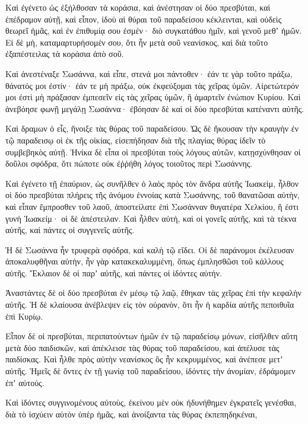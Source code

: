 {\par }{\PP {}Καὶ ἐγένετο ὡς ἐξήλθοσαν τὰ κοράσια, καὶ ἀνέστησαν οἱ δύο πρεσβύται, καὶ ἐπέδραμον αὐτῇ,
καὶ εἶπον, ἰδοὺ αἱ θύραι τοῦ παραδείσου κέκλεινται, καὶ οὐδεὶς θεωρεῖ ἡμᾶς, καὶ ἐν ἐπιθυμίᾳ σου ἐσμέν· διὸ συγκατάθου ἡμῖν, καὶ γενοῦ μεθʼ ἡμῶν.
Εἰ δὲ μὴ, καταμαρτυρήσομέν σου, ὅτι ἦν μετὰ σοῦ νεανίσκος, καὶ διὰ τοῦτο ἐξαπέστειλας τὰ κοράσια ἀπὸ σοῦ.
\par }{\PP {}Καὶ ἀνεστέναξε Σωσάννα, καὶ εἶπε, στενά μοι πάντοθεν· ἐάν τε γὰρ τοῦτο πράξω, θάνατός μοι ἐστίν· ἐάν τε μὴ πράξω, οὐκ ἐκφεύξομαι τὰς χεῖρας ὑμῶν.
Αἱρετώτερόν μοι ἐστὶ μὴ πράξασαν ἐμπεσεῖν εἰς τὰς χεῖρας ὑμῶν, ἢ ἁμαρτεῖν ἐνώπιον Κυρίου.
Καὶ ἀνεβόησε φωνῇ μεγάλῃ Σωσάννα· ἐβόησαν δὲ καὶ οἱ δύο πρεσβύται κατέναντι αὐτῆς.
\par }{\PP {}Καὶ δραμων ὁ εἷς, ἤνοιξε τὰς θύρας τοῦ παραδείσου.
Ὡς δὲ ἤκουσαν τὴν κραυγὴν ἐν τῷ παραδεισῳ οἱ ἐκ τῆς οἰκίας, εἰσεπήδησαν διὰ τῆς πλαγίας θύρας ἰδεῖν τὸ συμβεβηκὸς αὐτῇ.
Ἡνίκα δὲ εἶπα οἱ πρεσβύται τοὺς λόγους αὐτῶν, κατῃσχύνθησαν οἱ δοῦλοι σφόδρα, ὅτι πώποτε οὐκ ἐῤῥήθη λόγος τοιοῦτος περὶ Σωσάννης.
\par }{\PP {}Καὶ ἐγένετο τῇ ἐπαύριον, ὡς συνῆλθεν ὁ λαὸς πρὸς τὸν ἄνδρα αὐτῆς Ἰωακεὶμ, ἦλθον οἱ δύο πρεσβύται πλήρεις τῆς ἀνόμου ἐννοίας κατὰ Σωσάννης, τοῦ θανατῶσαι αὐτὴν,
καὶ εἶπαν ἔμπροσθεν τοῦ λαοῦ, ἀποστείλατε ἐπὶ Σωσάνναν θυγατέρα Χελκίου, ἥ ἐστι γυνὴ Ἰωακείμ· οἱ δὲ ἀπέστειλαν.
Καὶ ἦλθεν αὐτὴ, καὶ οἱ γονεῖς αὐτῆς, καὶ τὰ τέκνα αὐτῆς, καὶ πάντες οἱ συγγενεῖς αὐτῆς.
\par }{\PP {}Ἡ δὲ Σωσάννα ἦν τρυφερὰ σφόδρα, καὶ καλὴ τῷ εἴδει.
Οἱ δὲ παράνομοι ἐκέλευσαν ἀποκαλυφθῆναι αὐτὴν, ἦν γὰρ κατακεκαλυμμένη, ὅπως ἐμπλησθῶσι τοῦ κάλλους αὐτῆς.
Ἔκλαιον δὲ οἱ παρʼ αὐτῆς, καὶ πάντες οἱ ἰδόντες αὐτήν.
\par }{\PP {}Ἀναστάντες δὲ οἱ δύο πρεσβύται ἐν μέσῳ τῷ λαῷ, ἔθηκαν τὰς χεῖρας ἐπὶ τὴν κεφαλὴν αὐτῆς.
Ἡ δὲ κλαίουσα ἀνέβλεψεν εἰς τὸν οὐρανὸν, ὅτι ἦν ἡ καρδία αὐτῆς πεποιθυῖα ἐπὶ Κυρίῳ.
\par }{\PP {}Εἶπον δὲ οἱ πρεσβύται, περιπατούντων ἡμῶν ἐν τῷ παραδείσῳ μόνων, εἰσῆλθεν αὕτη μετὰ δύο παιδισκῶν, καὶ ἀπέκλεισε τὰς θύρας τοῦ παραδείσου, καὶ ἀπέλυσε τὰς παιδίσκας.
Καὶ ἦλθε πρὸς αὐτὴν νεανίσκος ὃς ἦν κεκρυμμένος, καὶ ἀνέπεσε μετʼ αὐτῆς.
Ἡμεῖς δὲ ὄντες ἐν τῇ γωνίᾳ τοῦ παραδείσου, ἰδόντες τὴν ἀνομίαν, ἐδράμομεν ἐπʼ αὐτούς.
\par }{\PP {}Καὶ ἰδόντες συγγινομένους αὐτοὺς, ἐκείνου μὲν οὐκ ἠδυνήθημεν ἐγκρατεῖς γενέσθαι, διὰ τὸ ἰσχύειν αὐτὸν ὑπὲρ ἡμᾶς, καὶ ἀνοίξαντα τὰς θύρας ἐκπεπηδηκέναι,
}
